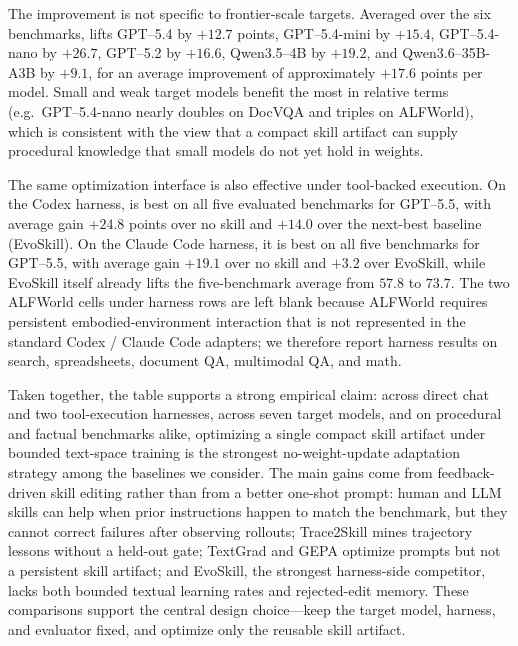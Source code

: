 The improvement is not specific to frontier-scale targets. Averaged over the six benchmarks, \ourmethod{} lifts GPT--5.4 by $+12.7$ points, GPT--5.4-mini by $+15.4$, GPT--5.4-nano by $+26.7$, GPT--5.2 by $+16.6$, Qwen3.5--4B by $+19.2$, and Qwen3.6--35B-A3B by $+9.1$, for an average improvement of approximately $+17.6$ points per model. Small and weak target models benefit the most in relative terms (e.g.\ GPT--5.4-nano nearly doubles on DocVQA and triples on ALFWorld), which is consistent with the view that a compact skill artifact can supply procedural knowledge that small models do not yet hold in weights.

The same optimization interface is also effective under tool-backed execution. On the Codex harness, \ourmethod{} is best on all five evaluated benchmarks for GPT--5.5, with average gain $+24.8$ points over no skill and $+14.0$ over the next-best baseline (EvoSkill). On the Claude Code harness, it is best on all five benchmarks for GPT--5.5, with average gain $+19.1$ over no skill and $+3.2$ over EvoSkill, while EvoSkill itself already lifts the five-benchmark average from $57.8$ to $73.7$. The two ALFWorld cells under harness rows are left blank because ALFWorld requires persistent embodied-environment interaction that is not represented in the standard Codex / Claude Code adapters; we therefore report harness results on search, spreadsheets, document QA, multimodal QA, and math.

Taken together, the table supports a strong empirical claim: across direct chat and two tool-execution harnesses, across seven target models, and on procedural and factual benchmarks alike, optimizing a single compact skill artifact under bounded text-space training is the strongest no-weight-update adaptation strategy among the baselines we consider. The main gains come from feedback-driven skill editing rather than from a better one-shot prompt: human and LLM skills can help when prior instructions happen to match the benchmark, but they cannot correct failures after observing rollouts; Trace2Skill mines trajectory lessons without a held-out gate; TextGrad and GEPA optimize prompts but not a persistent skill artifact; and EvoSkill, the strongest harness-side competitor, lacks both bounded textual learning rates and rejected-edit memory. These comparisons support the central design choice---keep the target model, harness, and evaluator fixed, and optimize only the reusable skill artifact.

